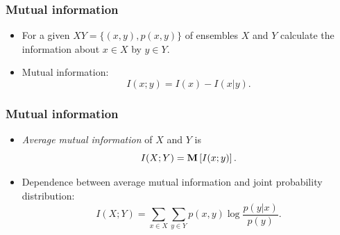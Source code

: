 \documentclass[14pt]{beamer}
\begin{document}

\begin{frame}
\frametitle{Mutual information}
\begin{itemize}

    \item
    For a given $XY = \{(x,y),p(x,y)\}$ of ensembles $X$ and $Y$ calculate the information about $x \in X$ by $y \in Y$.

    \pause \item
    Mutual information:
    \begin{equation}
    \label{eq5_2} I(x;y) = I(x) - I(x\vert y).
    \end{equation}



\end{itemize}
\end{frame}


\begin{frame}
\frametitle{Mutual information}
\begin{itemize}
    \item
    \textit{Average mutual information} of $X$ and $Y$ is
    \[
    I(X;Y) = {\rm {\bf M}}\left[ {I(x;y)} \right].
    \]

    \pause \item
    Dependence between average mutual information and joint probability distribution:
    \begin{equation}
    \label{eq5_3} I(X;Y) = \sum\limits_{x \in X} {\sum\limits_{y \in
    Y} {p(x,y)\log \frac{p(y\vert x)}{p(y)}} } .
    \end{equation}

\end{itemize}
\end{frame}
\end{document}
